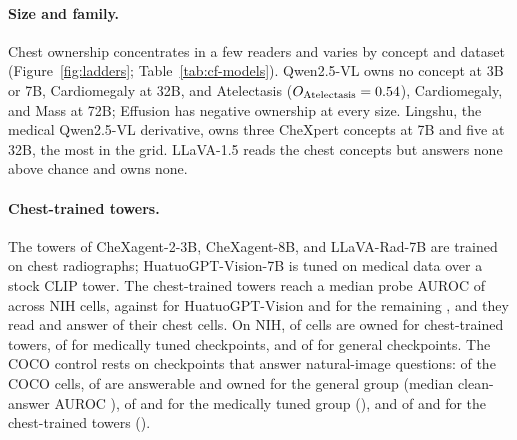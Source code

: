 \documentclass{article}
\begin{document}
\paragraph{Size and family.} Chest ownership concentrates in a few readers and varies by concept and dataset (Figure~\ref{fig:ladders}; Table~\ref{tab:cf-models}). Qwen2.5-VL owns no concept at 3B or 7B, Cardiomegaly at 32B, and Atelectasis ($O_{\mathrm{Atelectasis}}=0.54$), Cardiomegaly, and Mass at 72B; Effusion has negative ownership at every size. Lingshu, the medical Qwen2.5-VL derivative, owns three CheXpert concepts at 7B and five at 32B, the most in the grid. LLaVA-1.5 reads the chest concepts but answers none above chance and owns none.

\paragraph{Chest-trained towers.} The towers of CheXagent-2-3B, CheXagent-8B, and LLaVA-Rad-7B are trained on chest radiographs; HuatuoGPT-Vision-7B is tuned on medical data over a stock CLIP tower. The chest-trained towers reach a median probe AUROC of \cfSpecTowerProbeAuroc{} across \cfSpecTowerProbeN{} NIH cells, against \cfSpecStockProbeAuroc{} for HuatuoGPT-Vision and \cfSpecRestProbeAuroc{} for the remaining \cfSpecRestProbeN{}, and they read \cfSpecTowerReadable{} and answer \cfSpecTowerAnswerable{} of their \cfSpecTowerN{} chest cells. On NIH, \cfSpecNihTowerOwned{} of \cfSpecNihTowerN{} cells are owned for chest-trained towers, \cfSpecNihMedOwned{} of \cfSpecNihMedN{} for medically tuned checkpoints, and \cfSpecNihGenOwned{} of \cfSpecNihGenN{} for general checkpoints. The COCO control rests on checkpoints that answer natural-image questions: of the COCO cells, \cfSpecGenCocoAnswerable{} of \cfSpecGenCocoN{} are answerable and \cfSpecGenCocoOwned{} owned for the general group (median clean-answer AUROC \cfSpecGenCocoAnsAuroc{}), \cfSpecMedCocoAnswerable{} of \cfSpecMedCocoN{} and \cfSpecMedCocoOwned{} for the medically tuned group (\cfSpecMedCocoAnsAuroc{}), and \cfSpecTowerCocoAnswerable{} of \cfSpecTowerCocoN{} and \cfSpecTowerCocoOwned{} for the chest-trained towers (\cfSpecTowerCocoAnsAuroc{}).
\end{document}
